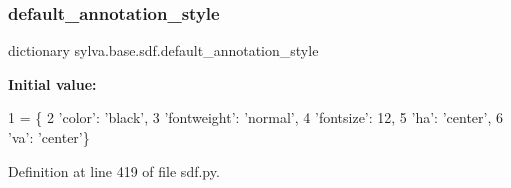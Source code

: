 \subsubsection{\texorpdfstring{default\+\_\+annotation\+\_\+style}{default\_annotation\_style}}
{\footnotesize\ttfamily dictionary sylva.\+base.\+sdf.\+default\+\_\+annotation\+\_\+style}

{\bfseries Initial value\+:}
\begin{DoxyCode}
1 =  \{
2         \textcolor{stringliteral}{'color'}: \textcolor{stringliteral}{'black'},
3         \textcolor{stringliteral}{'fontweight'}: \textcolor{stringliteral}{'normal'},
4         \textcolor{stringliteral}{'fontsize'}: 12,
5         \textcolor{stringliteral}{'ha'}: \textcolor{stringliteral}{'center'},
6         \textcolor{stringliteral}{'va'}: \textcolor{stringliteral}{'center'}\}
\end{DoxyCode}


Definition at line 419 of file sdf.\+py.

